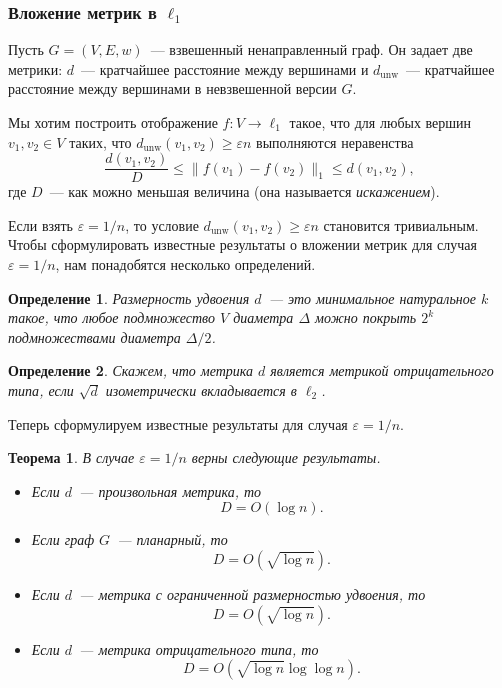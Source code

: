\documentclass[12pt]{article}
\newcommand{\eps}{\varepsilon}
\newcommand{\dunw}{d_{\mathrm{unw}}}
\newtheorem{definition}{Определение}
\newtheorem{theorem}{Теорема}
\begin{document}
    \subsubsection{Вложение метрик в $\ell_1$}
    \label{subsubsection_metric_embeddings}
    Пусть $G = (V, E, w)$~--- взвешенный ненаправленный граф. Он задает две метрики: $d$~--- кратчайшее расстояние
    между вершинами и $\dunw$~--- кратчайшее расстояние между вершинами в невзвешенной версии $G$.

    Мы хотим построить отображение $f \colon V \to \ell_1$ такое, что для любых вершин $v_1, v_2 \in V$ таких,
    что $\dunw(v_1, v_2) \geq \eps n$ выполняются неравенства
    $$
        \frac{d(v_1, v_2)}{D} \leq \|f(v_1) - f(v_2)\|_1 \leq d(v_1, v_2),
    $$
    где $D$~--- как можно меньшая величина (она называется \emph{искажением}).

    Если взять $\eps = 1/n$, то условие $\dunw(v_1, v_2) \geq \eps n$ становится тривиальным.
    Чтобы сформулировать известные результаты о вложении метрик для случая $\eps = 1/n$, нам понадобятся несколько
    определений.

    \begin{definition}
        \emph{Размерность удвоения} $d$~--- это минимальное натуральное $k$ такое, что любое подмножество $V$
        диаметра $\Delta$ можно покрыть $2^k$ подмножествами диаметра $\Delta / 2$.
    \end{definition}
    \begin{definition}
        Скажем, что метрика $d$ является \emph{метрикой отрицательного типа}, если $\sqrt{d}$ изометрически
        вкладывается в $\ell_2$.
    \end{definition}

    Теперь сформулируем известные результаты для случая $\eps = 1/n$.

    \begin{theorem}
        \label{embeddings}
        В случае $\eps = 1 / n$ верны следующие результаты.
        \begin{itemize}
            \item
            \cite{B85} Если $d$~--- произвольная метрика, то
            $$
                D = O(\log n).
            $$
            \item
            \cite{R99} Если граф $G$~--- планарный, то
            $$
                D = O\left(\sqrt{\log n}\right).
            $$
            \item
            \cite{GKL03} Если $d$~--- метрика с ограниченной размерностью удвоения, то
            $$
                D = O\left(\sqrt{\log n}\right).
            $$
            \item
            \cite{ALN05} Если $d$~--- метрика отрицательного типа, то
            $$
                D = O\left(\sqrt{\log n} \log \log n\right).
            $$
        \end{itemize}
    \end{theorem}
\end{document}
